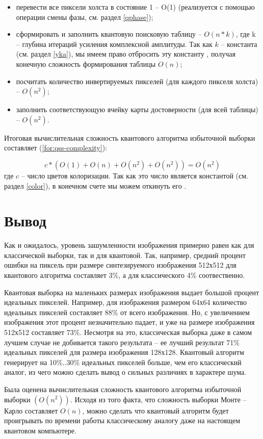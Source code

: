 \begin{itemize}
	\item перевести все пиксели холста в состояние 1 -- O(1) (реализуется с помощью операции смены фазы, см. раздел \ref{qphase});
	\item сформировать и заполнить квантовую поисковую таблицу -- $O(n * k)$, где k -- глубина итераций усиления комплексной амплитуды. Так как $k$ -- константа (см. раздел \ref{yka}), мы имеем право отбросить эту константу \cite{computation-complexity}, получая конечную сложность формирования таблицы $O(n)$;
	\item посчитать количество инвертируемых пикселей (для каждого пикселя холста) -- $O(n^2)$;
	\item заполнить соответствующую ячейку карты достоверности (для всей таблицы) -- $O(n^2)$.
\end{itemize}

Итоговая вычислительная сложность квантового алгоритма избыточной выборки составляет (\ref{for:qss-complexity}):

\begin{equation}
	\label{for:qss-complexity}
	c * (O(1) + O(n) + O(n^2) + O(n^2)) = O(n^2)
\end{equation}
где $c$ -- число цветов колоризации. Так как это число является константой (см. раздел \ref{color}), в конечном счете мы можем откинуть его \cite{computation-complexity}.

\section*{Вывод}

Как и ожидалось, уровень зашумленности изображения примерно равен как для классической выборки, так и для квантовой. Так, например, средний процент ошибки на пиксель при размере синтезируемого изображения 512х512 для квантового алгоритма составляет 3\%, а для классического 4\% соотвественно.

Квантовая выборка на маленьких размерах изображения выдает большой процент идеальных пикселей. Например, для изображения размером 64х64 количество идеальных пикселей составляет 88\% от всего изображения. Но, с увеличением изображения этот процент незначительно падает, и уже на размере изображения 512х512 составляет 73\%. Несмотря на это, классическая выборка даже в самом лучшем случае не добивается такого результата -- ее лучший результат 71\% идеальных пикселей для размера изображения 128х128. Квантовый алгоритм генерирует на 10\%..30\% идеальных пикселей больше, чем его классический аналог, из чего можно сделать вывод о сильных различиях в характере шума.

Была оценена вычислительная сложность квантового алгоритма избыточной выборки $(O(n^2))$. Исходя из того факта, что сложность выборки Монте -- Карло составляет $O(n)$, можно сделать что квантовый алгоритм будет проигрывать по времени работы классическому аналогу даже на настоящем квантовом компьютере.